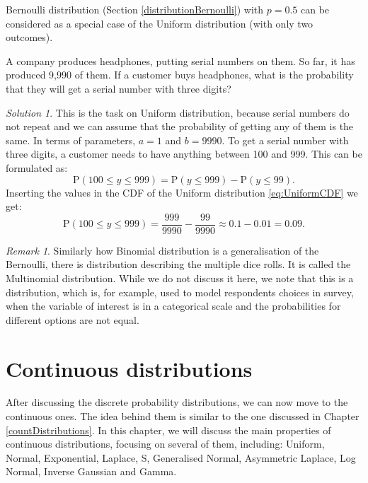 \documentclass[
]{book}
\theoremstyle{definition}
\theoremstyle{definition}
\theoremstyle{definition}
\theoremstyle{definition}
\theoremstyle{remark}
\newtheorem*{remark}{Remark}
\newtheorem*{solution}{Solution}
\begin{document}
Bernoulli distribution (Section \ref{distributionBernoulli}) with \(p=0.5\) can be considered as a special case of the Uniform distribution (with only two outcomes).

A company produces headphones, putting serial numbers on them. So far, it has produced 9,990 of them. If a customer buys headphones, what is the probability that they will get a serial number with three digits?

\begin{solution}
This is the task on Uniform distribution, because serial numbers do not repeat and we can assume that the probability of getting any of them is the same. In terms of parameters, \(a=1\) and \(b=9990\). To get a serial number with three digits, a customer needs to have anything between 100 and 999. This can be formulated as:
\begin{equation*}
    \mathrm{P}(100 \leq y \leq 999) = \mathrm{P}(y \leq 999) - \mathrm{P}(y \leq 99).
\end{equation*}
Inserting the values in the CDF of the Uniform distribution \eqref{eq:UniformCDF} we get:
\begin{equation*}
    \mathrm{P}(100 \leq y \leq 999) = \frac{999}{9990} - \frac{99}{9990} \approx 0.1 - 0.01 = 0.09.
\end{equation*}
\end{solution}

\begin{remark}
Similarly how Binomial distribution is a generalisation of the Bernoulli, there is distribution describing the multiple dice rolls. It is called the Multinomial distribution. While we do not discuss it here, we note that this is a distribution, which is, for example, used to model respondents choices in survey, when the variable of interest is in a categorical scale and the probabilities for different options are not equal.
\end{remark}

\hypertarget{distributions}{%
\chapter{Continuous distributions}\label{distributions}}

After discussing the discrete probability distributions, we can now move to the continuous ones. The idea behind them is similar to the one discussed in Chapter \ref{countDistributions}. In this chapter, we will discuss the main properties of continuous distributions, focusing on several of them, including: Uniform, Normal, Exponential, Laplace, S, Generalised Normal, Asymmetric Laplace, Log Normal, Inverse Gaussian and Gamma.
\end{document}
